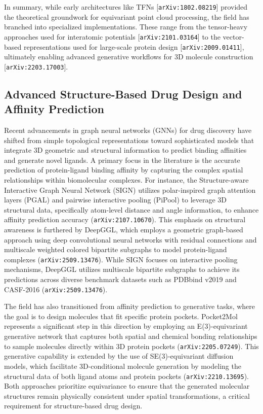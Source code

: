 \documentclass[11pt]{article}
\begin{document}
In summary, while early architectures like TFNs [\texttt{arXiv:1802.08219}] provided the theoretical groundwork for equivariant point cloud processing, the field has branched into specialized implementations. These range from the tensor-heavy approaches used for interatomic potentials [\texttt{arXiv:2101.03164}] to the vector-based representations used for large-scale protein design [\texttt{arXiv:2009.01411}], ultimately enabling advanced generative workflows for 3D molecule construction [\texttt{arXiv:2203.17003}].

\subsection{Advanced Structure-Based Drug Design and Affinity Prediction}

Recent advancements in graph neural networks (GNNs) for drug discovery have shifted from simple topological representations toward sophisticated models that integrate 3D geometric and structural information to predict binding affinities and generate novel ligands. A primary focus in the literature is the accurate prediction of protein-ligand binding affinity by capturing the complex spatial relationships within biomolecular complexes. For instance, the Structure-aware Interactive Graph Neural Network (SIGN) utilizes polar-inspired graph attention layers (PGAL) and pairwise interactive pooling (PiPool) to leverage 3D structural data, specifically atom-level distance and angle information, to enhance affinity prediction accuracy (\texttt{arXiv:2107.10670}). This emphasis on structural awareness is furthered by DeepGGL, which employs a geometric graph-based approach using deep convolutional neural networks with residual connections and multiscale weighted colored bipartite subgraphs to model protein-ligand complexes (\texttt{arXiv:2509.13476}). While SIGN focuses on interactive pooling mechanisms, DeepGGL utilizes multiscale bipartite subgraphs to achieve its predictions across diverse benchmark datasets such as PDBbind v2019 and CASF-2016 (\texttt{arXiv:2509.13476}).

The field has also transitioned from affinity prediction to generative tasks, where the goal is to design molecules that fit specific protein pockets. Pocket2Mol represents a significant step in this direction by employing an E(3)-equivariant generative network that captures both spatial and chemical bonding relationships to sample molecules directly within 3D protein pockets (\texttt{arXiv:2205.07249}). This generative capability is extended by the use of SE(3)-equivariant diffusion models, which facilitate 3D-conditional molecule generation by modeling the structural data of both ligand atoms and protein pockets (\texttt{arXiv:2210.13695}). Both approaches prioritize equivariance to ensure that the generated molecular structures remain physically consistent under spatial transformations, a critical requirement for structure-based drug design.
\end{document}
